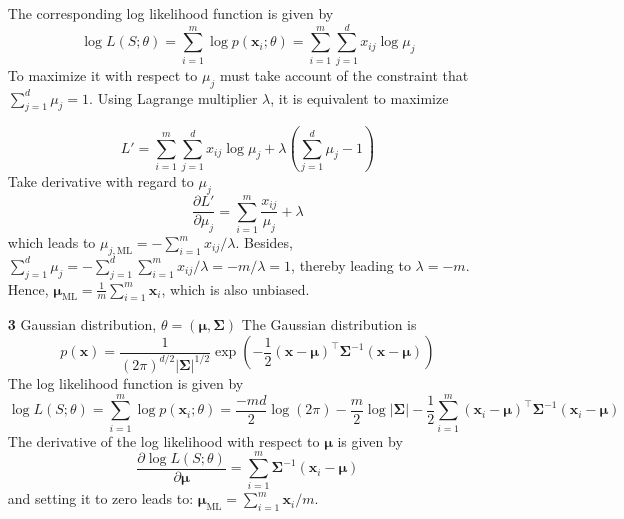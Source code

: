 \documentclass{article}
\begin{document}
\begin{itemize}
	The corresponding log likelihood function is given by
	\begin{equation*}
	\log L(S;\theta) = \sum_{i=1}^m \log p(\bm{x}_i;\theta) = \sum_{i=1}^m \sum_{j=1}^d x_{ij} \log \mu_j
	\end{equation*}
To maximize it with respect to $\mu_j$ must take account of the constraint that $\sum_{j=1}^d \mu_j=1$. Using Lagrange multiplier $\lambda$, it is equivalent to maximize 
	
	\begin{equation*}
	L' = \sum_{i=1}^m \sum_{j=1}^d x_{ij} \log \mu_j + \lambda \left( \sum_{j=1}^d \mu_j - 1 \right)
	\end{equation*}
Take derivative with regard to  $\mu_j$
	\begin{equation*}
	\frac{\partial L'}{\partial \mu_j} = \sum_{i=1}^m\frac{x_{ij}}{\mu_j} + \lambda
	\end{equation*}
which leads to $\mu_{j,\mathrm{ML}} = -\sum_{i=1}^m x_{ij}/\lambda$. Besides, $\sum_{j=1}^d \mu_j=-\sum_{j=1}^d \sum_{i=1}^m  x_{ij}/\lambda = -m/\lambda=1$, thereby leading to $\lambda=-m$. Hence, $\bm{\mu}_{\mathrm{ML}} = \frac{1}{m}\sum_{i=1}^m \bm{x}_i$, which is also unbiased.
	
	\item [\textbf{3}] Gaussian distribution, $\theta=(\bm{\mu},\bm{\Sigma})$
	The Gaussian distribution is 
	\begin{equation}
	p(\bm{x}) = \frac{1}{(2\pi)^{d/2} |\bm{\Sigma}|^{1/2}} \exp \left( -\frac{1}{2} (\bm{x} - \bm{\mu})^\top \bm{\Sigma}^{-1} (\bm{x} - \bm{\mu})\right)
	\end{equation}
	The log likelihood function is given by
	\begin{equation*}
	\log L(S;\theta) = \sum_{i=1}^m \log p(\bm{x}_i;\theta) 
	= \frac{-md}{2} \log (2\pi) - \frac{m}{2}\log |\bm{\Sigma}| - \frac{1}{2} \sum_{i=1}^m (\bm{x}_i - \bm{\mu})^\top \bm{\Sigma}^{-1} (\bm{x}_i - \bm{\mu})
	\end{equation*}
	The derivative of the log likelihood with respect to $\bm{\mu}$ is given by
	\begin{equation*}
	\frac{\partial \log L(S;\theta)}{\partial \bm{\mu}} = \sum_{i=1}^m \bm{\Sigma}^{-1} (\bm{x}_i - \bm{\mu})
	\end{equation*}
and setting it to zero leads to: $\bm{\mu}_{\mathrm{ML}}= \sum_{i=1}^m \bm{x}_i / m$.
	
	
	

\end{itemize}
\end{document}
